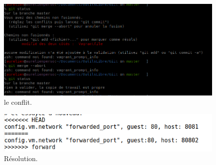 \documentclass{article}
\begin{document}
\begin{figure}[h]
\centering
\includegraphics[width=0.7\columnwidth]{screen/git3_3.png}
\caption{\label{fig:frog}le conflit.}
\end{figure}

\begin{figure}[h]
\centering
\includegraphics[width=0.7\columnwidth]{screen/git3_4.png}
\caption{\label{fig:frog}Résolution.}
\end{figure}
\end{document}
